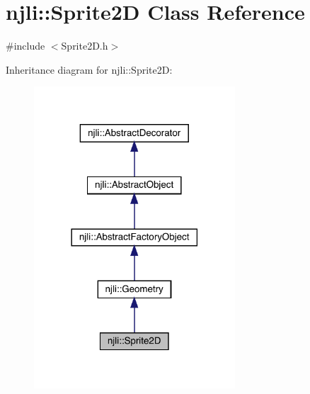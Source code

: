 \hypertarget{classnjli_1_1_sprite2_d}{}\section{njli\+:\+:Sprite2D Class Reference}
\label{classnjli_1_1_sprite2_d}


{\ttfamily \#include $<$Sprite2\+D.\+h$>$}



Inheritance diagram for njli\+:\+:Sprite2D\+:\nopagebreak
\begin{figure}[H]
\begin{center}
\leavevmode
\includegraphics[width=213pt]{classnjli_1_1_sprite2_d__inherit__graph}
\end{center}
\end{figure}


